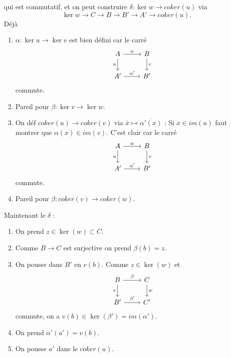 \documentclass[a4paper,12pt]{book}
\theoremstyle{plain}
\theoremstyle{definition}
\theoremstyle{remark}
\begin{document}
qui est commutatif, et on peut construire 
$\delta\colon \ker w\to coker(u)$ via \[\ker w \to C\to B\to B'\to A'\to
coker(u).\]
Déjà 
\begin{enumerate}
    \item $\alpha\colon \ker u\to \ker v$ est bien défini car le 
	carré 
\[\begin{tikzcd}
	A & B \\
	{A'} & {B'}
	\arrow["\alpha", from=1-1, to=1-2]
	\arrow["u"', from=1-1, to=2-1]
	\arrow["v", from=1-2, to=2-2]
	\arrow["{\alpha'}", from=2-1, to=2-2]
\end{tikzcd}\]
    commute.

    \item Pareil pour $\beta\colon \ker v\to \ker w$.
    \item On déf $coker(u)\to coker(v)$ via 
	$\bar x\mapsto \overline{\alpha'(x)}$ : Si $x\in im(u)$ faut 
	montrer que $\alpha(x)\in im(v)$. C'est clair car le carré
\[\begin{tikzcd}
	A & B \\
	{A'} & {B'}
	\arrow["\alpha", from=1-1, to=1-2]
	\arrow["u"', from=1-1, to=2-1]
	\arrow["v", from=1-2, to=2-2]
	\arrow["{\alpha'}", from=2-1, to=2-2]
\end{tikzcd}\]
    commute.
    \item Pareil pour $\beta\colon coker(v)\to coker(w)$.
\end{enumerate}
Maintenant le $\delta$ :
\begin{enumerate}
    \item On prend $z\in \ker(w)\subset C$.
    \item Comme $B\to C$ est surjective on prend $\beta(b)=z$.
    \item On pousse dans $B'$ en $v(b)$. Comme $z\in \ker(w)$ et 
\[\begin{tikzcd}
	B & C \\
	{B'} & {C'}
	\arrow["\beta", from=1-1, to=1-2]
	\arrow["v"', from=1-1, to=2-1]
	\arrow["w", from=1-2, to=2-2]
	\arrow["{\beta'}", from=2-1, to=2-2]
\end{tikzcd}\]
    commute, on a $v(b)\in \ker(\beta')=im(\alpha')$.
    \item On prend $\alpha'(a')=v(b)$. 
    \item On pousse $a'$ dans le $coker(u)$.
\end{enumerate}
\end{document}
